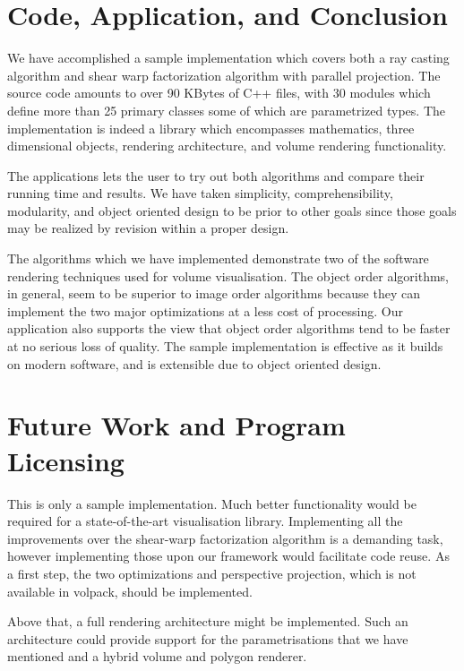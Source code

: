 \documentclass[a4paper,12pt]{article}
\begin{document}
\section{Code, Application, and Conclusion}

We have accomplished a sample implementation which covers both a ray
casting algorithm and shear warp factorization algorithm with parallel
projection. The source code amounts to over 90 KBytes of C++ files,
with 30 modules which define more than 25 primary classes some of
which are parametrized types. The
implementation is indeed a library which encompasses mathematics,
three dimensional objects, rendering architecture, and volume
rendering functionality. 

The applications lets the user to try out both algorithms and compare
their running time and results. We have taken simplicity, 
comprehensibility, modularity, and object oriented design to be prior
to other goals since those goals may be realized by revision within a proper
design.

The algorithms which we have implemented demonstrate two of the
software rendering techniques used for volume visualisation. The
object order algorithms, in general, seem to be superior to image
order algorithms because they can implement the two major
optimizations at a less cost of processing. Our application
also supports the view that object order algorithms tend to be faster
at no serious loss of quality. The sample implementation is
effective as it builds on modern software, and is extensible due to
object oriented design.


\section{Future Work and Program Licensing}

This is only a sample implementation. Much better functionality
would be required for a state-of-the-art visualisation library.
Implementing all the improvements over the shear-warp factorization
algorithm is a demanding task, however implementing those upon our
framework would facilitate code reuse. As a first step, the two
optimizations and perspective projection, which is not available in
volpack, should be implemented.

Above that, a full rendering architecture might be implemented. Such
an architecture could provide support for the parametrisations that we
have mentioned and a hybrid volume and polygon renderer.
\end{document}
